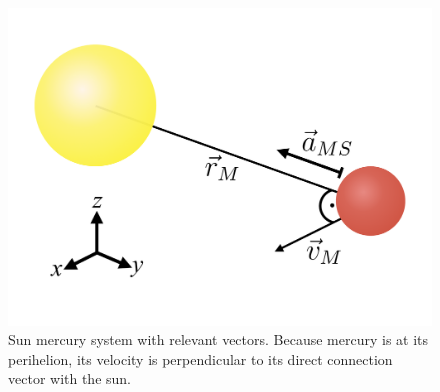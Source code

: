 \documentclass[12pt,ngerman,american]{iopart}
\begin{document}
%
\begin{figure}[htb]
	\centering
	\includegraphics[width=.5\textwidth]{figs/sun_merc.pdf}
	\caption{\label{fig:sun_merc}%
		Sun mercury system with relevant vectors.
		Because mercury is at its perihelion, its velocity is perpendicular to its direct connection vector with the sun.%
	}
\end{figure}
%
\end{document}
